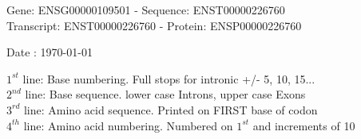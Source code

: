 \documentclass{article}
\begin{document}
\begin{center}
\begin{large}
Gene: ENSG00000109501 - Sequence: ENST00000226760\\
Transcript: ENST00000226760 - Protein: ENSP00000226760
 
 Date : \today
\end{large}
\end{center}
$1^{st}$ line: Base numbering. Full stops for intronic +/- 5, 10, 15...\\
$2^{nd}$ line: Base sequence. lower case Introns, upper case Exons\\
$3^{rd}$ line: Amino acid sequence. Printed on FIRST base of codon\\
$4^{th}$ line: Amino acid numbering. Numbered on $1^{st}$ and increments of 10\\
\end{document}

